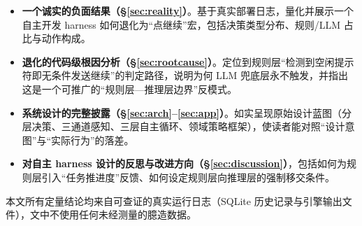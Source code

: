 \begin{itemize}
  \item \textbf{一个诚实的负面结果（\S\ref{sec:reality}）}。基于真实部署日志，量化并展示一个自主开发 harness 如何退化为“点继续”宏，包括决策类型分布、规则/LLM 占比与动作构成。
  \item \textbf{退化的代码级根因分析（\S\ref{sec:rootcause}）}。定位到规则层“检测到空闲提示符即无条件发送继续”的判定路径，说明为何 LLM 兜底层永不触发，并指出这是一个可推广的“规则层—推理层边界”反模式。
  \item \textbf{系统设计的完整披露（\S\ref{sec:arch}--\ref{sec:app}）}。如实呈现原始设计蓝图（分层决策、三通道感知、三层自主循环、领域策略框架），使读者能对照“设计意图”与“实际行为”的落差。
  \item \textbf{对自主 harness 设计的反思与改进方向（\S\ref{sec:discussion}）}，包括如何为规则层引入“任务推进度”反馈、如何设定规则层向推理层的强制移交条件。
\end{itemize}

本文所有定量结论均来自可查证的真实运行日志（SQLite 历史记录与引擎输出文件），文中不使用任何未经测量的臆造数据。
